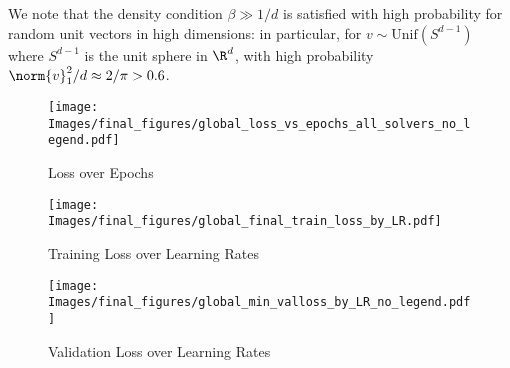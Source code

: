\documentclass{article}
\begin{document}
    We note that the density condition $\beta \gg 1/d$ is satisfied with high probability for random unit vectors in high dimensions: in particular, for $v\sim\textrm{Unif}(S^{d-1})$ where $S^{d-1}$ is the unit sphere in $\R^d$, with high probability $\norm{v}^2_1/d \approx 2/\pi > 0.6$.

\begin{figure*}
    \centering
    \begin{subfigure}[t]{0.325\textwidth}
        \centering
        \texttt{[image: Images/final\_figures/global\_loss\_vs\_epochs\_all\_solvers\_no\_legend.pdf]}
        \caption{Loss over Epochs}
        \label{fig:linear-layers-global-reparam-loss-vs-epochs}
    \end{subfigure}
    \begin{subfigure}[t]{0.32\textwidth} %
        \centering
        \texttt{[image: Images/final\_figures/global\_final\_train\_loss\_by\_LR.pdf]}
        \caption{Training Loss over Learning Rates}
        \label{fig:linear-layers-global-reparam-loss-vs-LR}
    \end{subfigure}
    \begin{subfigure}[t]{0.32\textwidth} %
        \centering
        \texttt{[image: Images/final\_figures/global\_min\_valloss\_by\_LR\_no\_legend.pdf]}
        \caption{Validation Loss over Learning Rates}
        \label{fig:linear-layers-global-reparam-valloss-vs-LR}
    \end{subfigure}
    \caption{Training multilayer linear networks (\ref{eq:linear-feedforward-objective}). Both SGD and SGD with momentum are equivariant optimization methods, so their results in original and reparameterized coordinates are exactly superimposed. In \cref{fig:linear-layers-global-reparam-valloss-vs-LR} we consider the minimum validation loss achieved over epochs during training. Results are aggregated over 10 independent trials, with traces showing medians and shading indicating 25th-75th quartile. Asterisks indicate the learning rate used for each method in \cref{fig:linear-layers-global-reparam-loss-vs-epochs}. Learning rates chosen to minimize validation loss of the algorithm in \textit{original} coordinates.
    }
    \label{fig:global-reparam-linear-layers}
\end{figure*}
\end{document}
